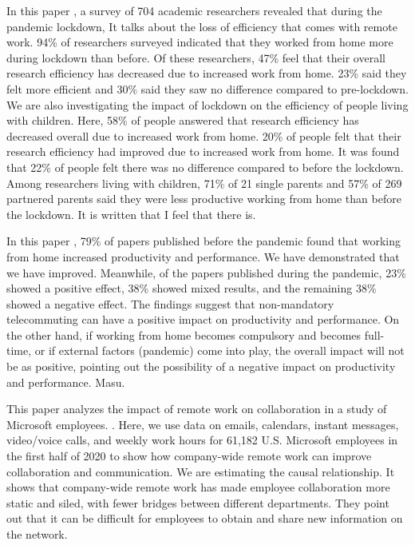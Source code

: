 \documentclass[12pt]{article}
\begin{document}
In this paper \cite{ref9}, a survey of 704 academic researchers revealed that
during the pandemic lockdown,
It talks about the loss of efficiency that comes with remote work. 94\% of
researchers surveyed indicated that they worked from home more during lockdown
than before. Of these researchers, 47\% feel that their overall research
efficiency has decreased due to increased work from home. 23\% said they felt
more efficient and 30\% said they saw no difference compared to pre-lockdown.
We are also investigating the impact of lockdown on the efficiency of people
living with children. Here, 58\% of people answered that research efficiency
has decreased overall due to increased work from home. 20\% of people felt that
their research efficiency had improved due to increased work from home. It was
found that 22\% of people felt there was no difference compared to before the
lockdown. Among researchers living with children, 71\% of 21 single parents and
57\% of 269 partnered parents said they were less productive working from home
than before the lockdown. It is written that I feel that there is.

In this paper \cite{ref10}, 79\% of papers published before the pandemic found
that working from home
increased productivity and performance. We have demonstrated that we have
improved. Meanwhile, of the papers published during the pandemic, 23\% showed a
positive effect, 38\% showed mixed results, and the remaining 38\% showed a
negative effect. The findings suggest that non-mandatory telecommuting can have
a positive impact on productivity and performance. On the other hand, if
working from home becomes compulsory and becomes full-time, or if external
factors (pandemic) come into play, the overall impact will not be as positive,
pointing out the possibility of a negative impact on productivity and
performance. Masu.

This paper \cite{ref11} analyzes the
impact of remote work on collaboration in a study of Microsoft employees. .
Here, we use data on emails, calendars, instant messages, video/voice calls,
and weekly work hours for 61,182 U.S. Microsoft employees in the first half of
2020 to show how company-wide remote work can improve collaboration and
communication. We are estimating the causal relationship. It shows that
company-wide remote work has made employee collaboration more static and siled,
with fewer bridges between different departments. They point out that it can be
difficult for employees to obtain and share new information on the network.
\end{document}
